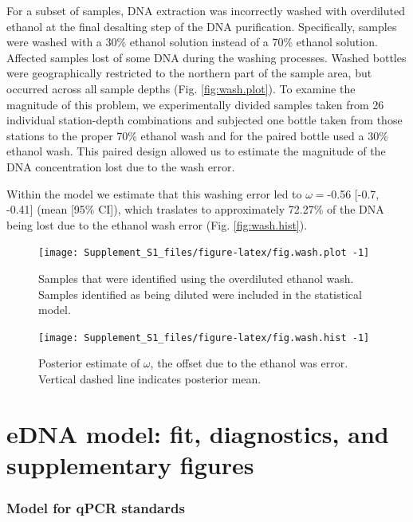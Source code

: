 \documentclass[
]{article}
\begin{document}
For a subset of samples, DNA extraction was incorrectly washed with
overdiluted ethanol at the final desalting step of the DNA purification.
Specifically, samples were washed with a 30\% ethanol solution instead
of a 70\% ethanol solution. Affected samples lost of some DNA during the
washing processes. Washed bottles were geographically restricted to the
northern part of the sample area, but occurred across all sample depths
(Fig. \ref{fig:wash.plot}). To examine the magnitude of this problem, we
experimentally divided samples taken from 26 individual station-depth
combinations and subjected one bottle taken from those stations to the
proper 70\% ethanol wash and for the paired bottle used a 30\% ethanol
wash. This paired design allowed us to estimate the magnitude of the DNA
concentration lost due to the wash error.

Within the model we estimate that this washing error led to
\(\omega =\)-0.56 {[}-0.7, -0.41{]} (mean {[}95\% CI{]}), which
traslates to approximately 72.27\% of the DNA being lost due to the
ethanol wash error (Fig. \ref{fig:wash.hist}).

\begin{figure}
\texttt{[image: Supplement\_S1\_files/figure-latex/fig.wash.plot -1]} \caption{\label{fig:wash.plot} Samples that were identified using the overdiluted ethanol wash. Samples identified as being diluted were included in the statistical model.}\label{fig:fig.wash.plot }
\end{figure}

\begin{figure}
\texttt{[image: Supplement\_S1\_files/figure-latex/fig.wash.hist -1]} \caption{\label{fig:wash.hist} Posterior estimate of \(\omega \), the offset due to the ethanol was error. Vertical dashed line indicates posterior mean. }\label{fig:fig.wash.hist }
\end{figure}

\newpage
\clearpage

\hypertarget{edna-model-fit-diagnostics-and-supplementary-figures}{%
\section{eDNA model: fit, diagnostics, and supplementary
figures}\label{edna-model-fit-diagnostics-and-supplementary-figures}}

\hypertarget{model-for-qpcr-standards}{%
\subsubsection{Model for qPCR
standards}\label{model-for-qpcr-standards}}
\end{document}
